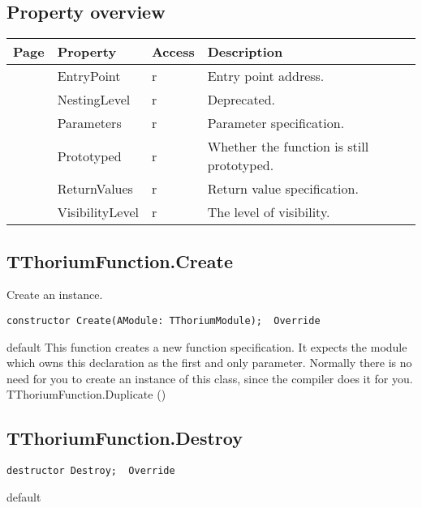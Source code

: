 \subsection{Property overview}
\label{thoriumcorepkg:thorium:tthoriumfunction:properties}
\begin{tabularx}{\textwidth}{lllX}
Page & Property & Access & Description \\ \hline
\pageref{thoriumcorepkg:thorium:tthoriumfunction:entrypoint} & EntryPoint & r & Entry point address. \\
\pageref{thoriumcorepkg:thorium:tthoriumfunction:nestinglevel} & NestingLevel & r & Deprecated. \\
\pageref{thoriumcorepkg:thorium:tthoriumfunction:parameters} & Parameters & r & Parameter specification. \\
\pageref{thoriumcorepkg:thorium:tthoriumfunction:prototyped} & Prototyped & r & Whether the function is still prototyped. \\
\pageref{thoriumcorepkg:thorium:tthoriumfunction:returnvalues} & ReturnValues & r & Return value specification. \\
\pageref{thoriumcorepkg:thorium:tthoriumfunction:visibilitylevel} & VisibilityLevel & r & The level of visibility. \\
\hline
\end{tabularx}
\subsection{TThoriumFunction.Create}
\label{thoriumcorepkg:thorium:tthoriumfunction:create}
\begin{FPCList}
\Synopsis
Create an instance.\Declaration 

\begin{verbatim}
constructor Create(AModule: TThoriumModule);  Override
\end{verbatim}
\Visibility
default
\Description
This function creates a new function specification. It expects the module which owns this declaration as the first and only parameter. Normally there is no need for you to create an instance of this class, since the compiler does it for you.\SeeAlso
TThoriumFunction.Duplicate (\pageref{thoriumcorepkg:thorium:tthoriumfunction:duplicate})\end{FPCList}
\subsection{TThoriumFunction.Destroy}
\label{thoriumcorepkg:thorium:tthoriumfunction:destroy}
\begin{FPCList}
\Declaration 

\begin{verbatim}
destructor Destroy;  Override
\end{verbatim}
\Visibility
default
\end{FPCList}
